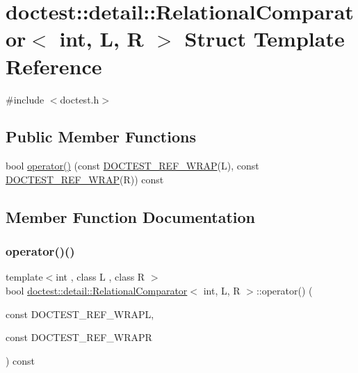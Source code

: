 \hypertarget{structdoctest_1_1detail_1_1_relational_comparator}{}\section{doctest\+:\+:detail\+:\+:Relational\+Comparator$<$ int, L, R $>$ Struct Template Reference}
\label{structdoctest_1_1detail_1_1_relational_comparator}


{\ttfamily \#include $<$doctest.\+h$>$}

\subsection*{Public Member Functions}
\begin{DoxyCompactItemize}
\item 
bool \hyperlink{structdoctest_1_1detail_1_1_relational_comparator_a51062ad46cd23c982838a0a51df70512}{operator()} (const \hyperlink{doctest_8h_af2901cafb023c57fb672ccb1bf14f2eb}{D\+O\+C\+T\+E\+S\+T\+\_\+\+R\+E\+F\+\_\+\+W\+R\+AP}(L), const \hyperlink{doctest_8h_af2901cafb023c57fb672ccb1bf14f2eb}{D\+O\+C\+T\+E\+S\+T\+\_\+\+R\+E\+F\+\_\+\+W\+R\+AP}(R)) const
\end{DoxyCompactItemize}


\subsection{Member Function Documentation}
\mbox{\label{structdoctest_1_1detail_1_1_relational_comparator_a51062ad46cd23c982838a0a51df70512}} 
\subsubsection{\texorpdfstring{operator()()}{operator()()}}
{\footnotesize\ttfamily template$<$int , class L , class R $>$ \\
bool \hyperlink{structdoctest_1_1detail_1_1_relational_comparator}{doctest\+::detail\+::\+Relational\+Comparator}$<$ int, L, R $>$\+::operator() (\begin{DoxyParamCaption}\item[{const }]{D\+O\+C\+T\+E\+S\+T\+\_\+\+R\+E\+F\+\_\+\+W\+R\+APL,  }\item[{const }]{D\+O\+C\+T\+E\+S\+T\+\_\+\+R\+E\+F\+\_\+\+W\+R\+APR }\end{DoxyParamCaption}) const\hspace{0.3cm}{\ttfamily [inline]}}

